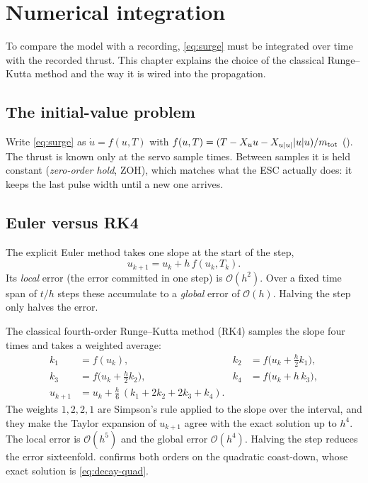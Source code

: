\chapter{Numerical integration}
\label{ch:integration}

To compare the model with a recording, \eqref{eq:surge} must be integrated over time with the
recorded thrust. This chapter explains the choice of the classical Runge--Kutta method and
the way it is wired into the propagation.

\section{The initial-value problem}

Write \eqref{eq:surge} as $\dot u = f(u, T)$ with
$f(u, T) = (T - X_u u - X_{u|u|}|u|u)/m_\mathrm{tot}$ (). The thrust is known only at
the servo sample times. Between samples it is held constant (\emph{zero-order hold}, ZOH),
which matches what the ESC actually does: it keeps the last pulse width until a new one
arrives.

\section{Euler versus RK4}

The explicit Euler method takes one slope at the start of the step,
\begin{equation}
  u_{k+1} = u_k + h\,f(u_k, T_k).
  \label{eq:euler-step}
\end{equation}
Its \emph{local} error (the error committed in one step) is $\mathcal{O}(h^2)$. Over a fixed
time span of $t/h$ steps these accumulate to a \emph{global} error of $\mathcal{O}(h)$.
Halving the step only halves the error.

The classical fourth-order Runge--Kutta method (RK4) \cite{butcher2016} samples the slope four
times and takes a weighted average:
\begin{equation}
\begin{aligned}
  k_1 &= f(u_k), &
  k_2 &= f\bigl(u_k + \tfrac{h}{2}k_1\bigr), \\
  k_3 &= f\bigl(u_k + \tfrac{h}{2}k_2\bigr), &
  k_4 &= f\bigl(u_k + h\,k_3\bigr), \\
  u_{k+1} &= u_k + \tfrac{h}{6}\,(k_1 + 2k_2 + 2k_3 + k_4). &&
\end{aligned}
\label{eq:rk4}
\end{equation}
The weights $1,2,2,1$ are Simpson's rule applied to the slope over the interval, and they
make the Taylor expansion of $u_{k+1}$ agree with the exact solution up to $h^4$. The local
error is $\mathcal{O}(h^5)$ and the global error $\mathcal{O}(h^4)$. Halving the step reduces
the error sixteenfold.  confirms both orders on the quadratic coast-down,
whose exact solution is \eqref{eq:decay-quad}.


